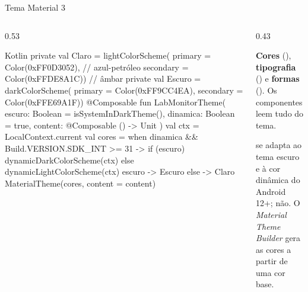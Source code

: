 \documentclass[aspectratio=169,10pt]{beamer}
\begin{document}
\begin{frame}[fragile]{Tema Material 3}
  \begin{columns}[T]
    \begin{column}{0.53\textwidth}
\begin{codigo}[title=ui/theme/Theme.kt]{Kotlin}
private val Claro = lightColorScheme(
  primary = Color(0xFF0D3052),    // azul-petróleo
  secondary = Color(0xFFDE8A1C))  // âmbar
private val Escuro = darkColorScheme(
  primary = Color(0xFF9CC4EA),
  secondary = Color(0xFFE69A1F))
@Composable fun LabMonitorTheme(
  escuro: Boolean = isSystemInDarkTheme(),
  dinamica: Boolean = true,
  content: @Composable () -> Unit
) {
  val ctx = LocalContext.current
  val cores = when {
    dinamica && Build.VERSION.SDK_INT >= 31 ->
      if (escuro) dynamicDarkColorScheme(ctx)
      else dynamicLightColorScheme(ctx)
    escuro -> Escuro
    else -> Claro
  }
  MaterialTheme(cores, content = content)
}
\end{codigo}
    \end{column}
    \begin{column}{0.43\textwidth}
      \begin{conceito}
        \textbf{Cores} (), \textbf{tipografia} () e \textbf{formas} (). Os componentes leem tudo do tema.
      \end{conceito}
      \begin{center}
      \end{center}
      \begin{dica}
         se adapta ao tema escuro e à cor dinâmica do Android 12+;  não. O \emph{Material Theme Builder} gera as cores a partir de uma cor base.
      \end{dica}
    \end{column}
  \end{columns}
\end{frame}
\end{document}
